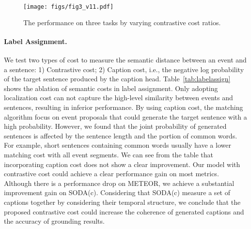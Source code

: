  \begin{table}[]
\caption{Comparison of different semantic-aware costs.}
\small
\vspace{-0.5em}
\renewcommand\arraystretch{0.9}
\centering
        \makeatletter{}\makeatother
\label{tab:labelassign}
\vspace{-1.0em}
\end{table}

\begin{figure*}[]
    \centering
    \texttt{[image: figs/fig3\_v11.pdf]}
         \vspace{-0.7 em}
    \caption{The performance on three tasks by varying contrastive cost ratios.}
    \label{fig:clratio}
    \vspace{-1.0em}
\end{figure*}

\vspace{-1.0em}
\paragraph{\textbf{Label Assignment.}} We test two types of cost to measure the semantic distance between an event and a sentence: 1) Contrastive cost; 2) Caption cost, i.e., the negative log probability of the target sentence produced by the caption head. Table~\ref{tab:labelassign} shows the ablation of semantic costs in label assignment. Only adopting localization cost can not capture the high-level similarity between events and sentences, resulting in inferior performance. By using caption cost, the matching algorithm focus on event proposals that could generate the target sentence with a high probability. However, we found that the joint probability of generated sentences is affected by the sentence length and the portion of common words. For example, short sentences containing common words usually have a lower matching cost with all event segments. We can see from the table that incorporating caption cost does not show a clear improvement. Our model with contrastive cost could achieve a clear performance gain on most metrics. Although there is a performance drop on METEOR, we achieve a substantial improvement gain on SODA(c). Considering that SODA(c) measure a set of captions together by considering their temporal structure, we conclude that the proposed contrastive cost could increase the coherence of generated captions and the accuracy of grounding results. 

